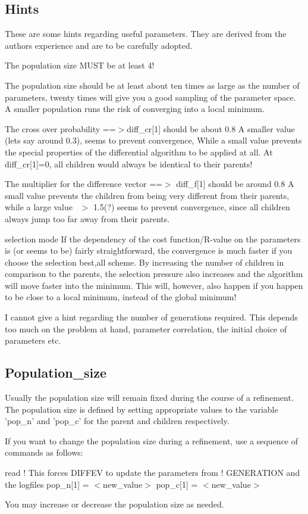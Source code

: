 \subsection*{Hints}
\par
These are some hints regarding useful parameters. They are derived 
from the authors experience and are to be carefully adopted. 
\par
The population size MUST be at least 4! 
\par
The population size should be at least about ten times as large as the 
number of parameters, twenty times will give you a good sampling of the 
parameter space. A smaller population runs the risk of converging into 
a local minimum. 
\par
The cross over probability ==$> $diff\_cr[1] should be about 0.8 
 A smaller value (lets say around 0.3), seems to prevent convergence, 
   While a small value prevents the special properties of the 
   differential algorithm to be applied at all. At diff\_cr[1]=0, 
   all children would always be identical to their parents! 
\par
The multiplier for the difference vector ==$> $ diff\_f[1] should be 
around 0.8 
   A small value prevents the children from being very different 
   from their parents, while a large value ~$> $ 1.5(?) seems to 
   prevent convergence, since all children always jump too far away 
   from their parents. 
\par
selection mode 
   If the dependency of the cost function/R-value on the parameters 
   is (or seems to be) fairly straightforward, the convergence is 
   much faster if you choose the selection best,all scheme. By increasing 
   the number of children in comparison to the parents, the selection 
   pressure also increases and the algorithm will move faster into 
   the minimum. This will, however, also happen if you happen to be close 
   to a local minimum, instead of the global minimum! 
\par
I cannot give a hint regarding the number of generations required. 
This depends too much on the problem at hand, parameter correlation, 
the initial choice of parameters etc. 
\subsection*{Population\_size}
\par
Usually the population size will remain fixed during the course of 
a refinement. The population size is defined by setting appropriate 
values to the variable 'pop\_n' and 'pop\_c' for the parent and 
children respectively. 
\par
If you want to change the population size during a refinement, use 
a sequence of commands as follows: 
\par
read         ! This forces DIFFEV to update the parameters from 
             ! GENERATION and the logfiles 
pop\_n[1] = $ <$new\_value$> $ 
pop\_c[1] = $ <$new\_value$> $ 
\par
You may increase or decrease the population size as needed. 

